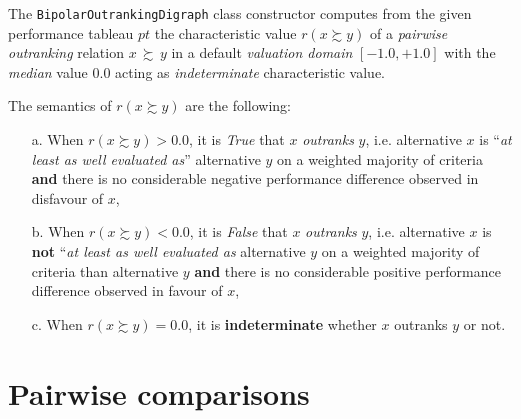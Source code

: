 The \texttt{BipolarOutrankingDigraph} class constructor computes from the given performance tableau $pt$ the characteristic value $r(x \succsim y)$ of a \emph{pairwise outranking} relation $x\, \succsim \,y$ in a default \emph{valuation domain} $[-1.0,+1.0]$ with the {\em median\/} value $0.0$ acting as \emph{indeterminate} characteristic value. 

The semantics of $r(x \succsim y)$ are the following:
\begin{definition}\label{def:3.1} 
\begin{itemize}[nosep]
\item [a.] When $r(x \succsim y) > 0.0$, it is \emph{True} that $x$ \emph{outranks} $y$, i.e. alternative $x$ is ``\emph{at least as well evaluated as}'' alternative $y$ on a weighted majority of criteria {\bf and} there is no considerable negative performance difference observed in disfavour of $x$,
\item [b.] When $r(x \succsim y) < 0.0$, it is \emph{False} that $x$ \emph{outranks} $y$, i.e. alternative $x$ is {\bf not} ``\emph{at least as well evaluated as} alternative $y$ on a weighted majority of criteria than alternative $y$ {\bf and} there is no considerable positive performance difference observed in favour of $x$,
\item [c.] When $r(x \succsim y) = 0.0$, it is {\bf indeterminate} whether $x$ outranks $y$ or not.
\end{itemize}
\end{definition}

\section{Pairwise comparisons}
\label{sec:3.3}

